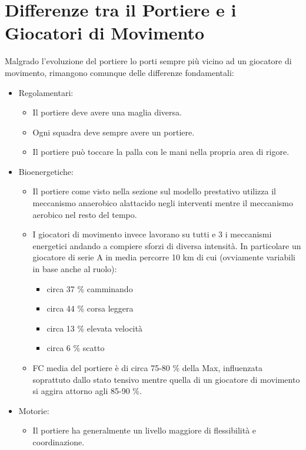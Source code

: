 \documentclass[../uefaC.tex]{subfiles}
\begin{document}
\section{Differenze tra il Portiere e i Giocatori di Movimento}
Malgrado l'evoluzione del portiere lo porti sempre più vicino ad un giocatore di movimento, rimangono comunque delle differenze fondamentali:
\begin{itemize}
    \item Regolamentari:
        \begin{itemize}
            \item Il portiere deve avere una maglia diversa.
            \item Ogni squadra deve sempre avere un portiere.
            \item Il portiere può toccare la palla con le mani nella propria area di rigore.
        \end{itemize}
    \item Bioenergetiche:
        \begin{itemize}
            \item Il portiere come visto nella sezione sul modello prestativo utilizza il meccanismo anaerobico alattacido negli interventi mentre il meccanismo aerobico nel resto del tempo.
            \item I giocatori di movimento invece lavorano su tutti e 3 i meccanismi energetici andando a compiere sforzi di diversa intensità. In particolare un giocatore di serie A in media percorre 10 km di cui (ovviamente variabili in base anche al ruolo):
                \begin{itemize}
                    \item circa 37 \% camminando
                    \item circa 44 \% corsa leggera
                    \item circa 13 \% elevata velocità 
                    \item circa 6 \% scatto
                \end{itemize}
            \item FC media del portiere è di circa 75-80 \% della Max, influenzata soprattuto dallo stato tensivo mentre quella di un giocatore di movimento si aggira attorno agli 85-90 \%.
        \end{itemize}
    \item Motorie:
        \begin{itemize}
            \item Il portiere ha generalmente un livello maggiore di flessibilità e coordinazione.

\end{itemize}
\end{itemize}
\end{document}
